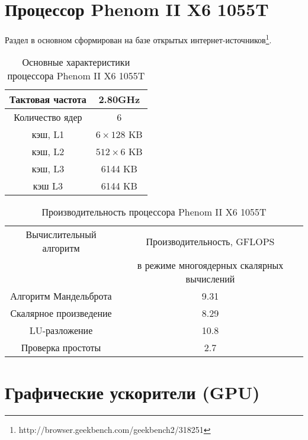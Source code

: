 \clearpage
\section{Процессор Phenom II X6 1055T}
\label{app_phenom}
\begin{table}[ht]
	\begin{center}
		\caption{Основные характеристики процессора Phenom II X6 1055T}
Раздел в основном сформирован на базе открытых интернет-источников\footnote{http://browser.geekbench.com/geekbench2/318251}.		
		
		\begin{tabular}{|c|c|}
			\hline	
			Тактовая частота & 2.80GHz   \\ \hline
			Количество ядер & 6 	     \\ \hline
			кэш, L1 &  $6\times 128$  KB     \\ \hline
			кэш, L2 &  $512\times 6$ KB       \\ \hline
			кэш, L3         &  6144 KB      \\ \hline
			кэш L3         &  6144 KB        \\ \hline
		\end{tabular}
	\end{center} 	
\end{table} 	

\begin{table}[ht]
	\begin{center}
		\caption{Производительность процессора Phenom II X6 1055T}
		\begin{tabular}{|c|c|}
			\hline	
			Вычислительный алгоритм &  Производительность, GFLOPS \\ 
			& в режиме многоядерных скалярных вычислений \\ \hline
			Алгоритм Мандельброта  &  9.31 	\\ \hline
			Скалярное произведение &  8.29   \\ \hline
			LU-разложение          &  10.8  \\ \hline
			Проверка простоты      &  2.7  \\ \hline 
						
			
		\end{tabular}
	\end{center} 	
\end{table} 	

\clearpage
\section{Графические ускорители (GPU)}

